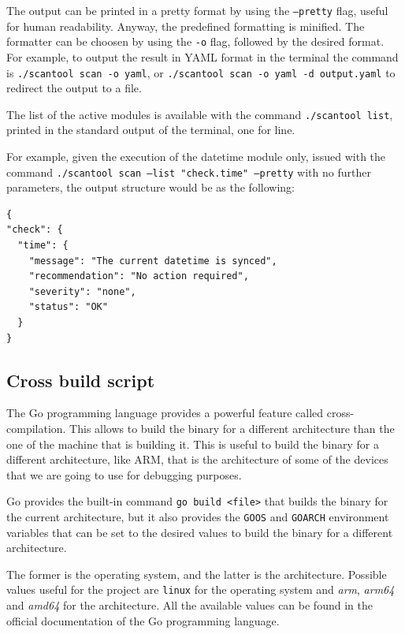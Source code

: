 The output can be printed in a pretty format by using the \texttt{--pretty} flag, useful for human readability. Anyway, the predefined formatting is minified. The formatter can be choosen by using the \texttt{-o} flag, followed by the desired format. For example, to output the result in YAML format in the terminal the command is \texttt{./scantool scan -o yaml}, or \texttt{./scantool scan -o yaml -d output.yaml} to redirect the output to a file.

The list of the active modules is available with the command \texttt{./scantool list}, printed in the standard output of the terminal, one for line.

For example, given the execution of the datetime module only, issued with the command \texttt{./scantool scan --list "check.time" --pretty} with no further parameters, the output structure would be as the following:

\begin{lstlisting}[style=json, caption={Output of the datetime module}]
{
"check": {
  "time": {
    "message": "The current datetime is synced",
    "recommendation": "No action required",
    "severity": "none",
    "status": "OK"
  }
}
\end{lstlisting}

\subsection{Cross build script}

The Go programming language provides a powerful feature called cross-compilation. This allows to build the binary for a different architecture than the one of the machine that is building it. This is useful to build the binary for a different architecture, like ARM, that is the architecture of some of the devices that we are going to use for debugging purposes.

Go provides the built-in command \texttt{go build <file>} that builds the binary for the current architecture, but it also provides the \texttt{GOOS} and \texttt{GOARCH} environment variables that can be set to the desired values to build the binary for a different architecture.

The former is the operating system, and the latter is the architecture. Possible values useful for the project are \texttt{linux} for the operating system and \textit{arm}, \textit{arm64} and \textit{amd64} for the architecture. All the available values can be found in the official documentation of the Go programming language.~\cite{go-valid-goos-goarch-combinations}

